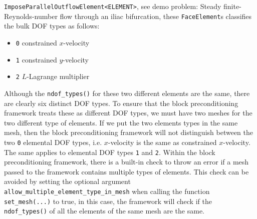 \begin{itemize}
\noindent\verb+ImposeParallelOutflowElement<ELEMENT>+, see demo problem: Steady finite-Reynolds-number flow through an iliac bifurcation, these \verb+FaceElement+s classifies the bulk DOF types as follows:
\begin{itemize}
 \item \verb+0+ constrained $x$-velocity
 \item \verb+1+ constrained $y$-velocity
 \item \verb+2+ $L$-Lagrange multiplier
\end{itemize}
Although the \verb+ndof_types()+ for these two different elements are the same, there are clearly six distinct DOF types. To ensure that the block preconditioning framework treats these as different DOF types, we must have two meshes for the two different type of elements. If we put the two elements types in the same mesh, then the block preconditioning framework will not distinguish between the two \verb+0+ elemental DOF types, i.e. $x$-velocity is the same as constrained $x$-velocity. The same applies to elemental DOF types \verb+1+ and \verb+2+. Within the block preconditioning framework, there is a built-in check to throw an error if a mesh passed to the framework contains multiple types of elements. This check can be avoided by setting the optional argument \verb+allow_multiple_element_type_in_mesh+ when calling the function \verb+set_mesh(...)+ to true, in this case, the framework will check if the \verb+ndof_types()+ of all the elements of the same mesh are the same.


\end{itemize}
